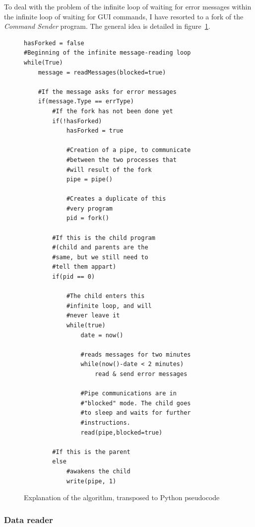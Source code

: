 \documentclass{themeensg}
\begin{document}
To deal with the problem of the infinite loop of waiting for error messages within the infinite loop of waiting for GUI commands, I have resorted to a fork of the \textit{Command Sender} program. The general idea is detailed in figure~\ref{fig:pseudocode}.\\


\begin{figure}[hb]
	\centering
	\lstset{language=Python}
 
	\begin{lstlisting}[frame=single]
hasForked = false
#Beginning of the infinite message-reading loop
while(True)	
	message = readMessages(blocked=true)
	
	#If the message asks for error messages
	if(message.Type == errType)
		#If the fork has not been done yet
		if(!hasForked)	
			hasForked = true
			
			#Creation of a pipe, to communicate
			#between the two processes that
			#will result of the fork
			pipe = pipe()
			
			#Creates a duplicate of this
			#very program
			pid = fork()
			
		#If this is the child program
		#(child and parents are the 
		#same, but we still need to
		#tell them appart)
		if(pid == 0)
		
			#The child enters this
			#infinite loop, and will
			#never leave it
			while(true)
				date = now()
				
				#reads messages for two minutes
				while(now()-date < 2 minutes)
					read & send error messages
					
				#Pipe communications are in 
				#"blocked" mode. The child goes
				#to sleep and waits for further
				#instructions.
				read(pipe,blocked=true)
				
		#If this is the parent
		else
			#awakens the child
			write(pipe, 1)				
	\end{lstlisting}
	\caption{Explanation of the algorithm, transposed to Python pseudocode}
	\label{fig:pseudocode}
\end{figure}

\subsubsection{Data reader}
\end{document}
